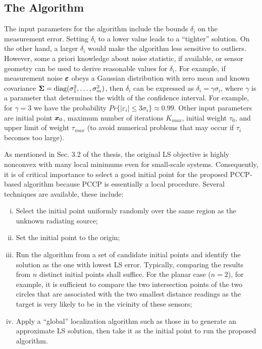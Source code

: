 \subsection{The Algorithm}
\phantom{m}

The input parameters for the algorithm include the bounds $\delta_i$ on the measurement error.  Setting $\delta_i$  to a lower value leads to a ``tighter'' solution. On the other hand, a larger $\delta_i$ would make the algorithm less sensitive to outliers.  However, some a priori knowledge about noise statistic, if available, or sensor geometry can be used 
to derive reasonable values for $\delta_i$. For example, if measurement noise $\mbox{\boldmath${\varepsilon}$}$ obeys a Gaussian distribution with zero mean and known covariance $\mbox{\boldmath${\Sigma}$} = \mbox{diag}(\sigma_1^2, \ldots, \sigma_m^2)$, then $\delta_i$ can be expressed as $\delta_i = \gamma \sigma_i$, where $\gamma$ is a parameter that determines the width of the confidence interval. For example, for $\gamma = 3$ we have the probability $Pr\{|\varepsilon_i| \leq 3\sigma_i\} \approx 0.99$. Other input parameters are initial point $\mbox{\boldmath$x$}_0$, maximum number of iterations $K_{max}$, initial weight $\tau_0$, and upper limit of weight $\tau_{max}$ (to avoid numerical problems that may occur  if $\tau_i$ becomes too large).

As mentioned in Sec. 3.2 of the thesis, the original LS objective is highly nonconvex with many local minimums even for small-scale systems. Consequently, it is of critical importance to select a good initial point for the proposed PCCP-based algorithm because PCCP is essentially a local procedure. Several techniques are available, these include: 
\begin{enumerate}[(i)]
\item
Select the initial point uniformly randomly over the same region as the unknown radiating source; 
\item
Set the initial point to the origin; 
\item
Run the algorithm from a set of candidate initial points and identify the solution as the one with lowest LS error. Typically, comparing the results from $n$ distinct initial points shall suffice. For the planar case ($n = 2$), for example, it is sufficient to compare the two intersection points of the two circles that are associated with the two smallest distance readings as the target is very likely to be in the vicinity of these sensors; 
\item
Apply a “global” localization algorithm such as those in \cite{BeckStLi} to generate an approximate LS solution, then take it as the initial point to run the proposed algorithm. 
\end{enumerate}


